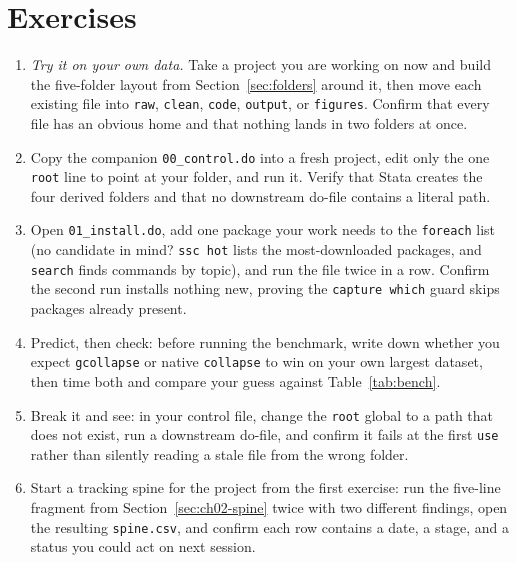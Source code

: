 \documentclass[
    a4paper,
    fontsize=10pt,
    twoside=true,
    numbers=noenddot,
]{kaobook}
\begin{document}
\section*{Exercises}
\begin{enumerate}
\item \emph{Try it on your own data.} Take a project you are working on now and build the five-folder layout from Section~\ref{sec:folders} around it, then move each existing file into \texttt{raw}, \texttt{clean}, \texttt{code}, \texttt{output}, or \texttt{figures}. Confirm that every file has an obvious home and that nothing lands in two folders at once.
\item Copy the companion \texttt{00\_control.do} into a fresh project, edit only the one \texttt{root} line to point at your folder, and run it. Verify that Stata creates the four derived folders and that no downstream do-file contains a literal path.
\item Open \texttt{01\_install.do}, add one package your work needs to the \texttt{foreach} list (no candidate in mind? \texttt{ssc hot} lists the most-downloaded packages, and \texttt{search} finds commands by topic), and run the file twice in a row. Confirm the second run installs nothing new, proving the \texttt{capture which} guard skips packages already present.
\item Predict, then check: before running the benchmark, write down whether you expect \texttt{gcollapse} or native \texttt{collapse} to win on your own largest dataset, then time both and compare your guess against Table~\ref{tab:bench}.
\item Break it and see: in your control file, change the \texttt{root} global to a path that does not exist, run a downstream do-file, and confirm it fails at the first \texttt{use} rather than silently reading a stale file from the wrong folder.
\item Start a tracking spine for the project from the first exercise: run the five-line fragment from Section~\ref{sec:ch02-spine} twice with two different findings, open the resulting \texttt{spine.csv}, and confirm each row contains a date, a stage, and a status you could act on next session.
\end{enumerate}

\end{document}
